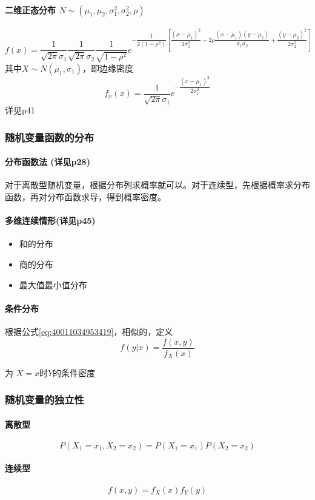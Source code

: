 \paragraph{二维正态分布 $N\sim (\mu_1,\mu_2,\sigma^2_1,\sigma^2_2,\rho )$}
\begin{equation*}
f(x)=\dfrac{1}{\sqrt{2\pi}\sigma_{1}} \dfrac{1}{\sqrt{2\pi}\sigma_{2}}
\dfrac{1}{\sqrt{1-\rho^2}}
e^{
	-\dfrac{1}{2(1-\rho^2)}
	\left[ 
	\dfrac{(x-\mu_{1})^{2}}{2\sigma_{1}^{2}}
	-2\rho\dfrac{(x-\mu_1)(y-\mu_2)}{\sigma_1 \sigma_2}
	+\dfrac{(y-\mu_{2})^{2}}{2\sigma_{2}^{2}}
\right] }
\end{equation*}
其中$X \sim N(\mu_1 ,\sigma_1)$，即边缘密度
\begin{equation*}
f_x(x)=\dfrac{1}{\sqrt{2\pi}\sigma_1}e^{-\dfrac{(x-\mu_1)^{2}}{2\sigma_1^{2}}}
\end{equation*}
详见p41


\subsubsection{随机变量函数的分布}

\paragraph{分布函数法 (详见p28)}
对于离散型随机变量，根据分布列求概率就可以。对于连续型，先根据概率求分布函数，再对分布函数求导，得到概率密度。

\paragraph{多维连续情形(详见p45)}

\begin{itemize}
\item 和的分布
\item 商的分布
\item 最大值最小值分布
  
\end{itemize}


\paragraph{条件分布}

根据公式\ref{eq:40011034953419}，相似的，定义
\begin{equation*}
  f(y|x)=\dfrac{f(x,y)}{f_{X}(x)}
\end{equation*}

为 $X=x$时$Y$的条件密度

\subsubsection{随机变量的独立性}

\paragraph{离散型}
\begin{equation*}
  P(X_{1}=x_{1},X_{2}=x_{2})=P(X_{1}=x_{1})P(X_{2}=x_{2})
\end{equation*}
\paragraph{连续型}
\begin{equation*}
  f(x,y)=f_{X}(x)f_{Y}(y)
\end{equation*}
